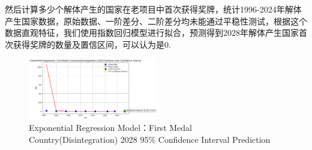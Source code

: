\documentclass[UTF8]{ctexart}
\begin{document}
然后计算多少个解体产生的国家在老项目中首次获得奖牌，统计1996-2024年解体产生国家数据，原始数据、一阶差分、二阶差分均未能通过平稳性测试，根据这个数据直观特征，我们使用指数回归模型进行拟合，预测得到2028年解体产生国家首次获得奖牌的数量及置信区间，可以认为是0.

\begin{figure}[h!]
    \centering
    \includegraphics[width=0.5\textwidth]{jieti}  %
    \caption{Exponential Regression Model：First Medal Country(Disintegration) 2028 95\% Confidence Interval Prediction}
    \label{fig:sample-image}
\end{figure}
\end{document}
